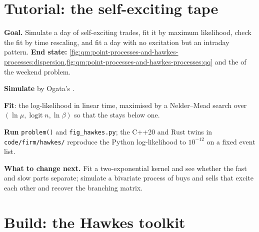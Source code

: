 \section{Tutorial: the self-exciting tape}\label{tut:qm:point-processes-and-hawkes-processes:tape}

\begin{tutorial}
\textbf{Goal.} Simulate a day of self-exciting trades, fit it by maximum likelihood, check the fit by time
rescaling, and fit a day with no excitation but an intraday pattern. \textbf{End state:}
\cref{fig:qm:point-processes-and-hawkes-processes:dispersion,fig:qm:point-processes-and-hawkes-processes:qq}
and the  of the weekend problem.
\begin{tutsteps}
\item \textbf{Simulate} by Ogata's .
\label{lst:qm:point-processes-and-hawkes-processes:thinning}
\item \textbf{Fit}: the log-likelihood in linear time, maximised by a Nelder--Mead search over $(\ln\mu,
\operatorname{logit}n, \ln\beta)$ so that the  stays below one.
\label{lst:qm:point-processes-and-hawkes-processes:loglik}
\item \textbf{Run} \texttt{problem()} and \texttt{fig\_hawkes.py}; the C++20 and Rust twins in
\texttt{code/firm/hawkes/} reproduce the Python log-likelihood to $10^{-12}$ on a fixed event list.
\end{tutsteps}
\textbf{What to change next.} Fit a two-exponential kernel and see whether the fast and slow parts separate;
simulate a bivariate process of buys and sells that excite each other and recover the branching matrix.
\end{tutorial}

\section{Build: the Hawkes toolkit}\label{bld:qm:point-processes-and-hawkes-processes:hawkes}

